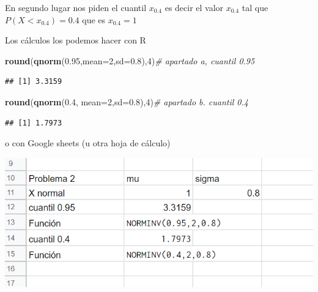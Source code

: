 \documentclass[
]{article}
\newenvironment{Shaded}{\begin{snugshade}}{\end{snugshade}}
\newcommand{\CommentTok}[1]{\textcolor[rgb]{0.56,0.35,0.01}{\textit{#1}}}
\newcommand{\DataTypeTok}[1]{\textcolor[rgb]{0.13,0.29,0.53}{#1}}
\newcommand{\DecValTok}[1]{\textcolor[rgb]{0.00,0.00,0.81}{#1}}
\newcommand{\FloatTok}[1]{\textcolor[rgb]{0.00,0.00,0.81}{#1}}
\newcommand{\KeywordTok}[1]{\textcolor[rgb]{0.13,0.29,0.53}{\textbf{#1}}}
\newcommand{\NormalTok}[1]{#1}
\begin{document}
En segundo lugar nos piden el cuantil \(x_{0.4}\) es decir el valor
\(x_{0.4}\) tal que \(P(X <x_{0.4})=0.4\) que es \(x_{0.4}=1\)

Los cálculos los podemos hacer con R

\begin{Shaded}
\begin{Highlighting}[]
\KeywordTok{round}\NormalTok{(}\KeywordTok{qnorm}\NormalTok{(}\FloatTok{0.95}\NormalTok{,}\DataTypeTok{mean=}\DecValTok{2}\NormalTok{,}\DataTypeTok{sd=}\FloatTok{0.8}\NormalTok{),}\DecValTok{4}\NormalTok{)}\CommentTok{\# apartado a,  cuantil 0.95}
\end{Highlighting}
\end{Shaded}

\begin{verbatim}
## [1] 3.3159
\end{verbatim}

\begin{Shaded}
\begin{Highlighting}[]
\KeywordTok{round}\NormalTok{(}\KeywordTok{qnorm}\NormalTok{(}\FloatTok{0.4}\NormalTok{, }\DataTypeTok{mean=}\DecValTok{2}\NormalTok{,}\DataTypeTok{sd=}\FloatTok{0.8}\NormalTok{),}\DecValTok{4}\NormalTok{)}\CommentTok{\# apartado b.  cuantil 0.4}
\end{Highlighting}
\end{Shaded}

\begin{verbatim}
## [1] 1.7973
\end{verbatim}

o con Google sheets (u otra hoja de cálculo)

\includegraphics[width=7.29in]{pro2_cont_1}

\newpage
\end{document}
